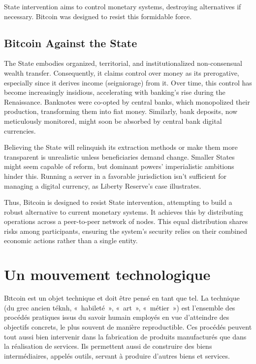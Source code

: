 \documentclass[
  a5paper,
  smalldemyvopaper,10pt,twoside,onecolumn,openright,extrafontsizes,hidelinks]{memoir}
\begin{document}
State intervention aims to control monetary systems, destroying
alternatives if necessary. Bitcoin was designed to resist this
formidable force.

\section*{Bitcoin Against the State}\label{bitcoin-contre-luxe9tat}


The State embodies organized, territorial, and institutionalized
non-consensual wealth transfer. Consequently, it claims control over
money as its prerogative, especially since it derives income
(seigniorage) from it. Over time, this control has become increasingly
insidious, accelerating with banking's rise during the Renaissance.
Banknotes were co-opted by central banks, which monopolized their
production, transforming them into fiat money. Similarly, bank deposits,
now meticulously monitored, might soon be absorbed by central bank
digital currencies.

Believing the State will relinquish its extraction methods or make them
more transparent is unrealistic unless beneficiaries demand change.
Smaller States might seem capable of reform, but dominant powers'
imperialistic ambitions hinder this. Running a server in a favorable
jurisdiction isn't sufficient for managing a digital currency, as
Liberty Reserve's case illustrates.

Thus, Bitcoin is designed to resist State intervention, attempting to
build a robust alternative to current monetary systems. It achieves this
by distributing operations across a peer-to-peer network of nodes. This
equal distribution shares risks among participants, ensuring the
system's security relies on their combined economic actions rather than
a single entity.


\chapter{Un mouvement technologique}\label{ch:cypherpunks}

\label{enotezch:5}{}

{B}\textsc{i}tcoin est un objet technique et doit être pensé en tant que
tel. La technique (du grec ancien \foreignlanguage{greek}{téknh},
«~habileté~», «~art~», «~métier~») est l'ensemble des procédés pratiques
issus du savoir humain employés en vue d'atteindre des objectifs
concrets, le plus souvent de manière reproductible. Ces procédés peuvent
tout aussi bien intervenir dans la fabrication de produits manufacturés
que dans la réalisation de services. Ils permettent aussi de construire
des biens intermédiaires, appelés outils, servant à produire d'autres
biens et services.
\end{document}
